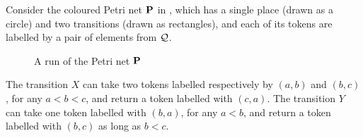 \documentclass[a4paper,11pt]{article}
\begin{document}
Consider the coloured Petri net $\pn$ in ,
which has a single place (drawn as a circle) and two transitions (drawn as rectangles),
and each of its tokens are labelled by a pair of elements from $\mathcal{Q}$.
%
\begin{figure}
\begin{minipage}[b]{0.55\textwidth}
\begin{center}
\caption{A Petri net $\pn$ with ordered data}\label{fig:PN}
\end{center}
\end{minipage}
\hfill
\begin{minipage}[b]{0.40\textwidth}
\begin{center}
\caption{A run of the Petri net $\pn$}\label{fig:run}
\end{center}
\end{minipage}
\end{figure}
%

The transition $X$ can take two tokens labelled respectively by $(a,b)$ and $(b,c)$,
for any $a < b < c$,
and return a token labelled with $(c,a)$.
The transition $Y$ can take one token labelled with $(b,a)$,
for any $a < b$,
and return a token labelled with $(b,c)$ as long as $b < c$.
\end{document}
